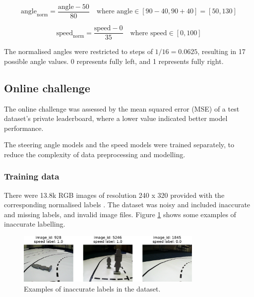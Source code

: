 \documentclass{article}
\begin{document}
\begin{equation}
  \text{angle}_{\text{norm}} = \frac{\text{angle} - 50}{80}
  \quad \text{where } \text{angle} \in [90 - 40, 90 + 40] = [50, 130]
\end{equation}

\begin{equation}
  \text{speed}_{\text{norm}} = \frac{\text{speed} - 0}{35}
  \quad \text{where } \text{speed} \in [0, 100]
\end{equation}

The normalised angles were restricted to steps of \(1/16 = 0.0625\), resulting in 17 possible angle values. 0 represents fully left, and 1 represents fully right.



\subsection{Online challenge}

The online challenge was assessed by the mean squared error (MSE) of a test dataset's private leaderboard, where a lower value indicated better model performance.

The steering angle models and the speed models were trained separately, to reduce the complexity of data preprocessing and modelling.

\subsubsection{Training data}

There were 13.8k RGB images of resolution 240 x 320 provided with the corresponding normalised labels \citep{Kaggle}. The dataset was noisy and included inaccurate and missing labels, and invalid image files. Figure \ref{fig:inaccurate_label} shows some examples of inaccurate labelling.

\begin{figure}[h]
  \centering
  \includegraphics[width=0.8\textwidth]{figures/inaccurate_label.pdf}
  \caption{Examples of inaccurate labels in the dataset.}
  \label{fig:inaccurate_label}
\end{figure}
\end{document}
